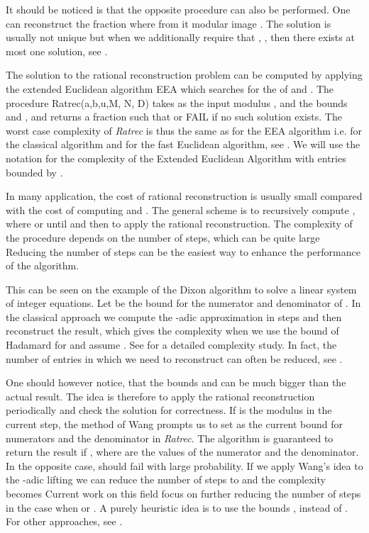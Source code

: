 \documentclass{acm_proc_article-sp}   \usepackage{graphicx,url}
\begin{document}
It should be noticed is that the opposite procedure can also be
performed. One can reconstruct the fraction  where
 from it modular image . The solution is
usually not unique but when we additionally require that , , then there exists at most one
solution, see \cite[Ch.5]{gathen}.



The solution to the rational reconstruction problem can be computed by
applying the extended Euclidean algorithm EEA which searches for the
 of  and . The procedure Ratrec(a,b,u,M, N, D) takes as the input modulus ,  and the bounds  and , and returns a fraction  such that  or FAIL if no such solution exists.
The worst case complexity of {\em Ratrec} is thus the same as for the
EEA algorithm i.e.  for the classical
algorithm and  for the fast Euclidean
algorithm, see \cite[Ch.11]{gathen}. We will use the notation  for the complexity of the Extended Euclidean Algorithm with entries bounded by .


In many application, the cost of rational reconstruction is usually
small compared with the cost of computing  and . The general scheme is to recursively compute , where  or  until  and then to apply the rational reconstruction. The complexity of the procedure depends on the number  of steps, which can be quite large
Reducing the number of steps can be the easiest way to enhance the
performance of the algorithm.

This can be seen on the example of the Dixon algorithm
\cite{Dixon1982} to solve a linear system  of integer
equations. Let  be the bound for the numerator and denominator
of . In the classical approach we compute the -adic
approximation in  steps and then
reconstruct the result, which gives the complexity
 when we use the bound of
Hadamard for  and assume .
See \cite{Mulders1999} for a detailed complexity study. In fact, the number of entries in  which we need to reconstruct can often be reduced, see \cite{Dumas2002Linbox}.



One should however notice, that the bounds  and  can be much
bigger than the actual result.
The idea is therefore to apply the rational reconstruction
periodically and check the solution for correctness.
If  is the modulus in the current step, the method of Wang
\cite{Wang} prompts us to set  as the current
bound for numerators and the denominator in {\em Ratrec}. The
algorithm is guaranteed to return the result if , where  are the values of the numerator and the
denominator. In the opposite case,
 should
fail with large probability.
If we apply Wang's idea to the -adic lifting we can reduce the
number of steps to  and the complexity becomes 
Current work on this field focus on further reducing the number of steps in the case when  or . A purely heuristic idea is to use the bounds ,  instead of . For other approaches, see \cite{kho-mon:2006,ol-sto:2006}.
\end{document}
